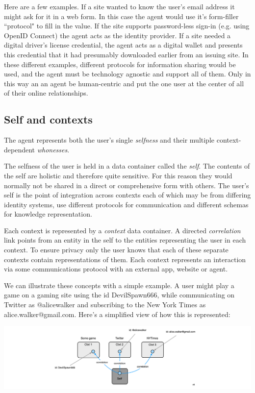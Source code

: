 \documentclass[11pt, oneside]{article}   	%
\begin{document}
Here are a few examples. If a site wanted to know the user's email address it might ask for it in a web form. In this case the agent would use it's form-filler ``protocol" to fill in the value. If the site supports password-less sign-in (e.g. using OpenID Connect) the agent acts as the identity provider. If a site needed a digital driver's license credential, the agent acts as a digital wallet and presents this credential that it had presumably downloaded earlier from an issuing site. In these different examples, different protocols for information sharing would be used, and the agent must be technology agnostic and support all of them. Only in this way an an agent be human-centric and put the one user at the center of all of their online relationships.

\subsection{Self and contexts}
The agent represents both the user's single \emph{selfness} and their multiple context-dependent \emph{whonesses}.

The selfness of the user is held in a data container called the \emph{self}. The contents of the self are holistic and therefore quite sensitive. For this reason they would normally not be shared in a direct or comprehensive form with others. The user's self is the point of integration across contexts each of which may be from differing identity systems, use different protocols for communication and different schemas for knowledge representation.

Each context is represented by a \emph{context} data container. A directed \emph{correlation} link points from an entity in the self to the entities representing the user in each context. To ensure privacy only the user knows that each of these separate contexts contain representations of them. Each context represents an interaction via some communications protocol with an external app, website or agent. 

We can illustrate these concepts with a simple example. A user might play a game on a gaming site using the id DevilSpawn666, while communicating on Twitter as @alicewalker and subscribing to the New York Times as alice.walker@gmail.com. Here's a simplified view of how this is represented:

\includegraphics[width=\textwidth]{./images/example1.png}
\end{document}
